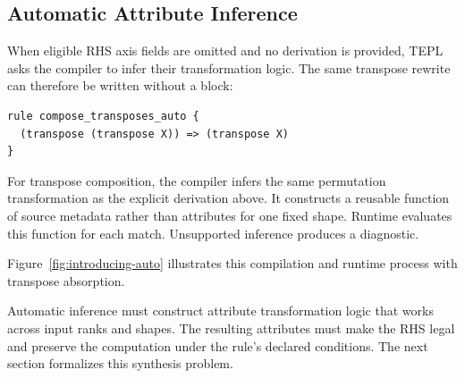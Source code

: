 \subsection{Automatic Attribute Inference}
\label{sec:auto}
When eligible RHS axis fields are omitted and no derivation is provided, TEPL asks the
compiler to infer their transformation logic. The same transpose rewrite
can therefore be written without a  block:
\begin{lstlisting}[language=TEPL]
rule compose_transposes_auto {
  (transpose (transpose X)) => (transpose X)
}
\end{lstlisting}
For transpose composition, the compiler infers the same permutation
transformation as the explicit derivation above. It constructs a reusable
function of source metadata rather than attributes for one fixed shape.
Runtime evaluates this function for each match. Unsupported inference
produces a diagnostic.

Figure~\ref{fig:introducing-auto} illustrates this compilation and runtime
process with transpose absorption.


Automatic inference must construct attribute transformation logic that works
across input ranks and shapes. The resulting attributes must make the RHS
legal and preserve the computation under the rule's declared conditions.
The next section formalizes this synthesis problem.

